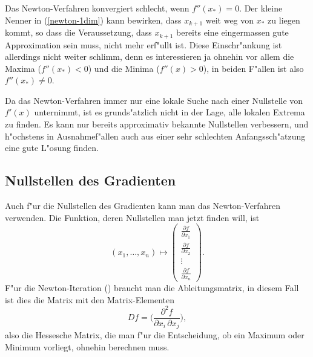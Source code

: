 Das Newton-Verfahren konvergiert schlecht, wenn $f''(x_*)=0$.
Der kleine Nenner in (\ref{newton-1dim}) kann bewirken, dass
$x_{k+1}$ weit weg von $x_*$ zu liegen kommt, so dass die
Veraussetzung, dass $x_{k+1}$ bereits eine eingermassen gute 
Approximation sein muss, nicht mehr erf"ullt ist.
Diese Einschr"ankung ist allerdings nicht weiter schlimm, denn
es interessieren ja ohnehin vor allem die Maxima ($f''(x_*)<0$)
und die Minima ($f''(x)>0$), in beiden F"allen ist also
$f''(x_*)\ne 0$.

Da das Newton-Verfahren immer nur eine lokale Suche nach einer
Nullstelle von $f'(x)$ unternimmt, ist es grunds"atzlich nicht
in der Lage, alle lokalen Extrema zu finden.
Es kann nur bereits approximativ bekannte Nullstellen verbessern,
und h"ochstens in Ausnahmef"allen auch aus einer sehr schlechten
Anfangssch"atzung eine gute L"osung finden.

\subsection{Nullstellen des Gradienten}
Auch f"ur die Nullstellen des Gradienten kann man das Newton-Verfahren
verwenden. Die Funktion, deren Nullstellen man jetzt finden will,
ist
\[
(x_1,\dots,x_n)\mapsto\begin{pmatrix}
\frac{\partial f}{\partial x_1}\\
\frac{\partial f}{\partial x_2}\\
\vdots\\
\frac{\partial f}{\partial x_n}
\end{pmatrix}.
\]
F"ur die Newton-Iteration (\label{nlp:newton-iteration-ndim}) braucht
man die Ableitungsmatrix, in diesem Fall ist dies
die Matrix mit den Matrix-Elementen
\[
Df=\biggl(
\frac{\partial^2f}{\partial x_i\,\partial x_j}
\biggr),
\]
also die Hessesche Matrix, die man f"ur die Entscheidung, ob ein
Maximum oder Minimum vorliegt, ohnehin berechnen muss.

